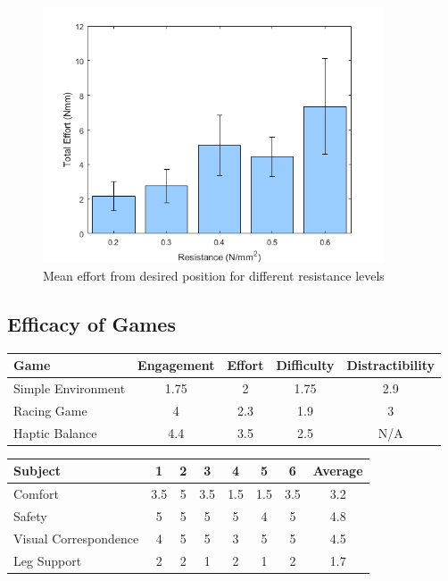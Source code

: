\documentclass[12pt]{report}
\begin{document}
\begin{figure}[h]
	\centering
	\includegraphics[width=0.9\textwidth]{eff_resist}
	\caption{Mean effort from desired position for different resistance levels}
	\label{fig:eff_resist}
\end{figure}		
		
	
	\subsection{Efficacy of Games}
	
	\begin{table}[h]
	\centering
	\begin{tabular}{l c c c c }
	\toprule
	Game & Engagement & Effort & Difficulty & Distractibility \\
	\midrule
	\rowcolor{gray!10} Simple Environment & 1.75 & 2  & 1.75 & 2.9 \\
	Racing Game & 4 & 2.3 & 1.9 & 3 \\
	\rowcolor{gray!10} Haptic Balance & 4.4 & 3.5 & 2.5 & N/A \\
	\bottomrule
	\end{tabular}
	\end{table}	
	

	
	\begin{table}[h]
	\centering
	\begin{tabular}{l c c c c c c c }
	\toprule
	Subject & 1 & 2 & 3 & 4 & 5 & 6 & Average \\
	\midrule
	\rowcolor{gray!10} Comfort & 3.5 & 5 & 3.5 & 1.5 & 1.5 & 3.5 & 3.2 \\
	Safety & 5 & 5 & 5 & 5 & 4  & 5 & 4.8 \\
	\rowcolor{gray!10} Visual Correspondence & 4 & 5 & 5 & 3 & 5 & 5 & 4.5  \\
	Leg Support & 2 & 2 & 1 & 2 & 1  & 2 & 1.7 \\
	\bottomrule
	\end{tabular}
	\end{table}
	
\end{document}
